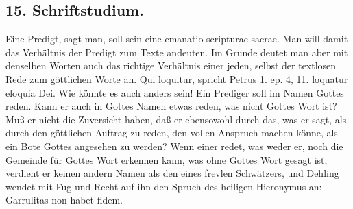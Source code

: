\subsection*{15. Schriftstudium.}

Eine Predigt, sagt man, soll sein eine emanatio scripturae sacrae. Man will damit das Verhältnis der Predigt zum Texte andeuten. Im Grunde deutet man aber mit denselben Worten auch das richtige Verhältnis einer jeden, selbst der textlosen Rede zum göttlichen Worte an. Qui loquitur, spricht Petrus 1. ep. 4, 11. loquatur eloquia Dei. Wie könnte es auch anders sein! Ein Prediger soll im Namen Gottes reden. Kann er auch in Gottes Namen etwas reden, was nicht Gottes Wort ist? Muß er nicht die Zuversicht haben, daß er ebensowohl durch das, was er sagt, als durch den göttlichen Auftrag zu reden, den vollen Anspruch machen könne, als ein Bote Gottes angesehen zu werden? Wenn einer redet, was weder er, noch die Gemeinde für Gottes Wort erkennen kann, was ohne Gottes Wort gesagt ist, verdient er keinen andern Namen als den eines frevlen Schwätzers, und Dehling wendet mit Fug und Recht auf ihn
den Spruch des heiligen Hieronymus an: Garrulitas non habet fidem.

